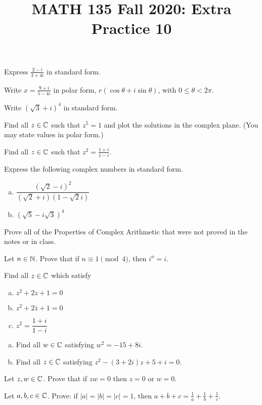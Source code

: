 
\usepackage{minted}

\title{MATH 135 Fall 2020: Extra Practice 10}


\thispagestyle{firstpage}

\textbf{\@title}


\question Express $\frac{2-i}{3+4i}$ in standard form.

\question Write $x=\frac{9+i}{5-4i}$ in polar form, $r(\cos\theta+i\sin\theta)$, with $0\leq\theta<2\pi$.

\question Write $(\sqrt{3}+i)^4$ in standard form.

\question Find all $z\in\mathbb{C}$ such that $z^5=1$ and plot the solutions in the complex plane.
(You may state values in polar form.)

\question Find all $z\in\mathbb{C}$ such that $z^2=\frac{1+i}{1-i}$.



\question Express the following complex numbers in standard form.
\begin{enumerate}[(a)]
  \item $\dfrac{(\sqrt2-i)^2}{(\sqrt2+i)(1-\sqrt2i)}$
  \item $(\sqrt5-i\sqrt3)^4$
\end{enumerate}

\question Prove all of the Properties of Complex Arithmetic that were not proved in the notes or in class.

\question Let $n \in \mathbb{N}$. Prove that if $n \equiv 1 \pmod 4$, then $i^n = i$.

\question Find all $z \in \mathbb{C}$ which satisfy
\begin{enumerate}[(a)]
  \item $z^2+2z+1=0$
  \item $z^2+2\bar{z}+1=0$
  \item $z^2 = \dfrac{1+i}{1-i}$
\end{enumerate}

\question \begin{enumerate}[(a)]
  \item Find all $w\in\mathbb{C}$ satisfying $w^2 = -15 + 8i$.
  \item Find all $z\in\mathbb{C}$ satisfying $z^2-(3+2i)z+5+i=0$.
\end{enumerate}

\question Let $z, w \in \mathbb{C}$. Prove that if $zw = 0$ then $z = 0$ or $w = 0$.

\question Let $a,b,c \in \mathbb{C}$. Prove: if $|a|=|b|=|c|=1$, then $\overline{a+b+c}=\frac1a+\frac1b+\frac1c$.

